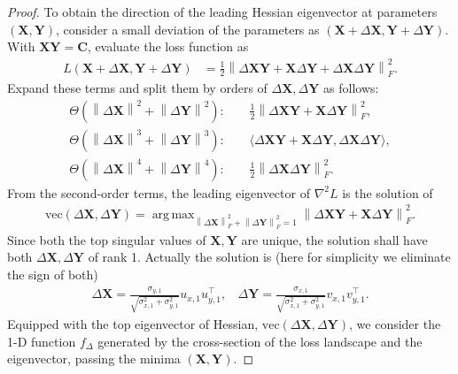 \documentclass{article}
\theoremstyle{plain}
\theoremstyle{remark}
\newcommand{\norm}[1]{\left\lVert#1\right\rVert}
\begin{document}
\begin{proof}
    To obtain the direction of the leading Hessian eigenvector at parameters $(\mathbf{X}, \mathbf{Y})$, consider a small deviation of the parameters as $(\mathbf{X}+\Delta \mathbf{X},\mathbf{Y}+\Delta \mathbf{Y})$. With $\mathbf{X}\mathbf{Y}=\mathbf{C}$, evaluate the loss function as
    \begin{align}
        L(\mathbf{X}+\Delta \mathbf{X},\mathbf{Y}+\Delta \mathbf{Y}) &= 
        \frac{1}{2}\norm{\Delta\mathbf{X}\mathbf{Y} + \mathbf{X}\Delta\mathbf{Y}+\Delta\mathbf{X}\Delta\mathbf{Y}}_F^2.
    \end{align}
    Expand these terms and split them by orders of $\Delta\mathbf{X},\Delta\mathbf{Y}$ as follows:
    \begin{align}
        \Theta(\norm{\Delta\mathbf{X}}^2+\norm{\Delta\mathbf{Y}}^2):& 
        ~~~~~\frac{1}{2}\norm{\Delta\mathbf{X}\mathbf{Y} + \mathbf{X}\Delta\mathbf{Y}}_F^2, \label{eq:mfloss_2nd}\\
        \Theta(\norm{\Delta\mathbf{X}}^3+\norm{\Delta\mathbf{Y}}^3):& 
        ~~~~~\langle \Delta\mathbf{X}\mathbf{Y} + \mathbf{X}\Delta\mathbf{Y}, \Delta\mathbf{X}\Delta\mathbf{Y} \rangle, \label{eq:mfloss_3rd}\\
        \Theta(\norm{\Delta\mathbf{X}}^4+\norm{\Delta\mathbf{Y}}^4):& 
        ~~~~~\frac{1}{2}\norm{\Delta\mathbf{X}\Delta\mathbf{Y}}_F^2. \label{eq:mfloss_4th}
    \end{align}
    From the second-order terms, the leading eigenvector of $\nabla^2 L$ is the solution of 
    \begin{align}
        \text{vec}(\Delta\mathbf{X}, \Delta\mathbf{Y}) = \mathop{\mathrm{arg\,max}}_{\norm{\Delta\mathbf{X}}_F^2+\norm{\Delta\mathbf{Y}}_F^2 = 1}\norm{\Delta\mathbf{X}\mathbf{Y} + \mathbf{X}\Delta\mathbf{Y}}_F^2.
    \end{align}
    Since both the top singular values of $\mathbf{X},\mathbf{Y}$ are unique, the solution shall have both $\Delta\mathbf{X}, \Delta\mathbf{Y}$ of rank 1. Actually the solution is (here for simplicity we eliminate the sign of both)
    \begin{align}
        \Delta\mathbf{X} = \frac{\sigma_{y,1}}{\sqrt{\sigma_{x,1}^2+\sigma_{y,1}^2}} u_{x,1}u_{y,1}^\top, ~~~~\Delta\mathbf{Y}=\frac{\sigma_{x,1}}{\sqrt{\sigma_{x,1}^2+\sigma_{y,1}^2}} v_{x,1}v_{y,1}^\top.
    \end{align}
    Equipped with the top eigenvector of Hessian, $\text{vec}(\Delta\mathbf{X}, \Delta\mathbf{Y})$, we consider the 1-D function $f_{\Delta}$ generated by the cross-section of the loss landscape and the eigenvector, passing the minima $(\mathbf{X},\mathbf{Y})$. 

\end{proof}
\end{document}
